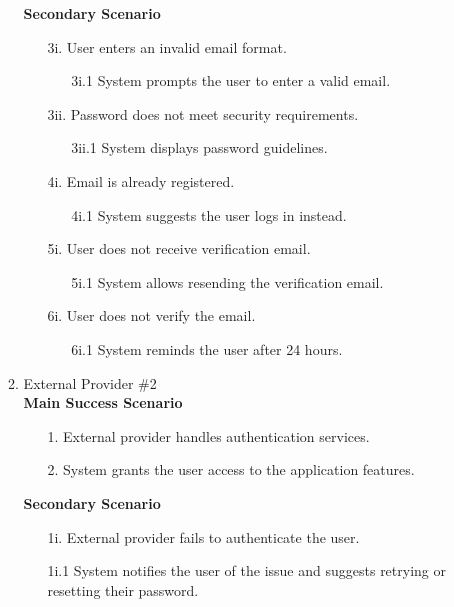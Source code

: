 \documentclass{article}
\begin{document}
\begin{enumerate}[{\bf BE1.}]
\begin{enumerate}[{\bf VP1.}]
	\textbf{Secondary Scenario}
	\begin{enumerate}
		\item[3i.] User enters an invalid email format.
		\begin{enumerate}
			\item[3i.1] System prompts the user to enter a valid email.
		\end{enumerate}
		\item[3ii.] Password does not meet security requirements.
		\begin{enumerate}
			\item[3ii.1] System displays password guidelines.
		\end{enumerate}
		\item[4i.] Email is already registered.
		\begin{enumerate}
			\item[4i.1] System suggests the user logs in instead.
		\end{enumerate}
		\item[5i.] User does not receive verification email.
		\begin{enumerate}
			\item[5i.1] System allows resending the verification email.
		\end{enumerate}
		\item[6i.] User does not verify the email.
		\begin{enumerate}
			\item[6i.1] System reminds the user after 24 hours.
		\end{enumerate}
	\end{enumerate}

    \item External Provider \#2 \\
        \textbf{Main Success Scenario}
	\begin{enumerate}
		\item [1. ]External provider handles authentication services.
            \item [2. ] System grants the user access to the application features.
	\end{enumerate}
        \textbf{Secondary Scenario}
	\begin{enumerate}
		\item [1i. ]External provider fails to authenticate the user.
            \item [1i.1 ] System notifies the user of the issue and suggests retrying or resetting their password.
	\end{enumerate}      
        

\end{enumerate}
\end{enumerate}
\end{document}
